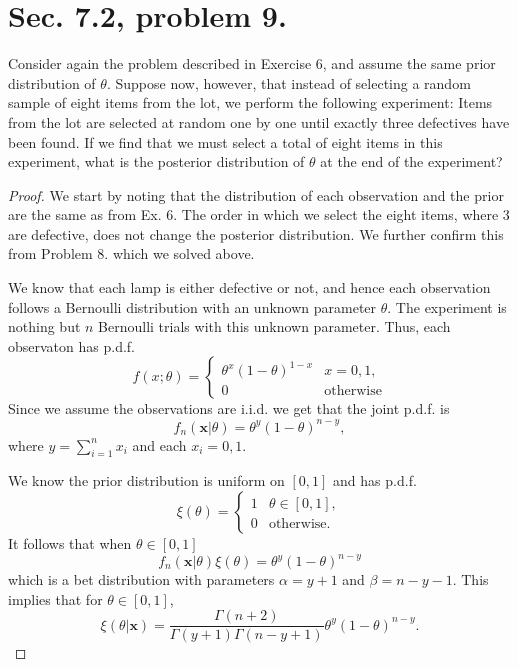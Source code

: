 \documentclass{article}
\newcommand{\pdf}{p.d.f. }
\newenvironment{hwproof}[1]
{
    #1
    \begin{proof}
}{
    \end{proof}
}
\begin{document}
\section{Sec. 7.2, problem 9.}
\begin{hwproof}
    {
        Consider again the problem described in Exercise 6, and assume the same
        prior distribution of $\theta$. Suppose now, however, that instead of
        selecting a random sample of eight items from the lot, we perform the
        following experiment: Items from the lot are selected at random one by
        one until exactly three defectives have been found. If we find that we
        must select a total of eight items in this experiment, what is the posterior
        distribution of $\theta$ at the end of the experiment?
    }
    We start by noting that the distribution of each observation and the prior
    are the same as from Ex. 6. The order in which we select the eight items,
    where 3 are defective, does not change the posterior distribution. We
    further confirm this from Problem 8. which we solved above.

    We know that each lamp is either defective or not, and hence each observation
    follows a Bernoulli distribution with an unknown parameter $\theta$. The
    experiment is nothing but $n$ Bernoulli trials with this unknown parameter.
    Thus, each observaton has \pdf
    \begin{equation*}
        f(x; \theta) = \begin{cases}
            \theta^x(1-\theta)^{1-x} & x = 0,1,         \\
            0                        & \text{otherwise}
        \end{cases}
    \end{equation*}
    Since we assume the observations are i.i.d. we get that the joint \pdf is
    \begin{equation*}
        f_n(\bm{x} | \theta) = \theta^y(1-\theta)^{n-y},
    \end{equation*}
    where $y = \sum_{i = 1}^n x_i$ and each $x_i = 0,1$.

    We know the prior distribution is uniform on $[0,1]$ and has \pdf
    \begin{equation*}
        \xi(\theta) = \begin{cases}
            1 & \theta \in [0,1], \\
            0 & \text{otherwise}.
        \end{cases}
    \end{equation*}
    It follows that when $\theta \in [0,1]$
    \begin{equation*}
        f_n(\bm{x} | \theta)\xi(\theta) = \theta^y(1-\theta)^{n-y}
    \end{equation*}
    which is a bet distribution with parameters $\alpha = y+ 1$ and
    $\beta = n - y - 1$. This implies that for $\theta \in [0,1]$,
    \begin{equation*}
        \xi(\theta | \bm{x}) = \frac{\Gamma(n + 2)}{\Gamma(y + 1)\Gamma(n-y+1)}
        \theta^y(1-\theta)^{n-y}.
    \end{equation*}


\end{hwproof}
\end{document}
